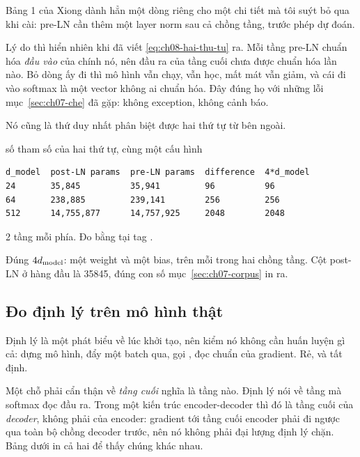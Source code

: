 %
Bảng 1 của Xiong dành hẳn một dòng riêng cho một chi tiết mà tôi suýt bỏ qua khi
cài: pre-LN cần thêm một layer norm sau cả chồng tầng, trước phép dự đoán.

Lý do thì hiển nhiên khi đã viết \eqref{eq:ch08-hai-thu-tu} ra. Mỗi tầng pre-LN
chuẩn hóa \emph{đầu vào} của chính nó, nên đầu ra của tầng cuối chưa được chuẩn
hóa lần nào. Bỏ dòng ấy đi thì mô hình vẫn chạy, vẫn học, mất mát vẫn giảm, và
cái đi vào softmax là một vector không ai chuẩn hóa. Đây đúng họ với những lỗi
mục~\ref{sec:ch07-che} đã gặp: không exception, không cảnh báo.

Nó cũng là thứ duy nhất phân biệt được hai thứ tự từ bên ngoài.

\begin{measured}{số tham số của hai thứ tự, cùng một cấu hình}
\begin{verbatim}
d_model  post-LN params  pre-LN params  difference  4*d_model
24       35,845          35,941         96          96
64       238,885         239,141        256         256
512      14,755,877      14,757,925     2048        2048
\end{verbatim}

2 tầng mỗi phía. Đo bằng  tại tag .
\end{measured}

Đúng \(4d_{\mathrm{model}}\): một weight và một bias, trên mỗi trong hai chồng tầng. Cột
post-LN ở hàng đầu là 35845, đúng con số mục~\ref{sec:ch07-corpus} in ra.

\subsection*{Đo định lý trên mô hình thật}

%
Định lý là một phát biểu về lúc khởi tạo, nên kiểm nó không cần huấn luyện gì
cả: dựng mô hình, đẩy một batch qua, gọi , đọc chuẩn của gradient.
Rẻ, và tất định.

Một chỗ phải cẩn thận về \emph{tầng cuối} nghĩa là tầng nào. Định lý nói về tầng
mà softmax đọc đầu ra. Trong một kiến trúc encoder-decoder thì đó là tầng cuối
của \emph{decoder}, không phải của encoder: gradient tới tầng cuối encoder phải
đi ngược qua toàn bộ chồng decoder trước, nên nó không phải đại lượng định lý
chặn. Bảng dưới in cả hai để thấy chúng khác nhau.

